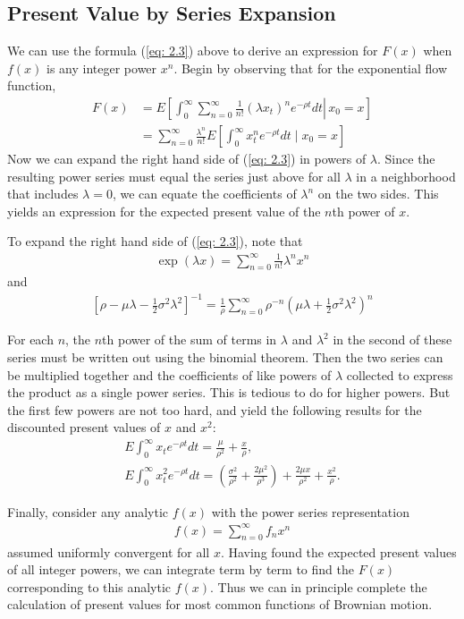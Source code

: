 \documentclass[\topdir/lecture\_notes.tex]{subfiles}
\begin{document}
\begin{optional}
\subsection{Present Value by Series Expansion}
We can use the formula (\ref{eq: 2.3}) above to derive an expression for $F(x)$ when $f(x)$ is any integer power $x^{n}$. Begin by observing that for the exponential flow function,
\begin{align*}
F(x) & =E\left[\left.\int_{0}^{\infty} \sum_{n=0}^{\infty} \frac{1}{n !}\left(\lambda x_{t}\right)^{n} e^{-\rho t} dt \right\rvert\, x_{0}=x\right] \\
& =\sum_{n=0}^{\infty} \frac{\lambda^{n}}{n !} E\left[\int_{0}^{\infty} x_{t}^{n} e^{-\rho t} dt \mid x_{0}=x\right]
\end{align*}
Now we can expand the right hand side of (\ref{eq: 2.3}) in powers of $\lambda$. Since the resulting power series must equal the series just above for all $\lambda$ in a neighborhood that includes $\lambda=0$, we can equate the coefficients of $\lambda^{n}$ on the two sides. This yields an expression for the expected present value of the $n$th power of $x$.

To expand the right hand side of (\ref{eq: 2.3}), note that
\begin{align*}
\exp (\lambda x)=\sum_{n=0}^{\infty} \frac{1}{n !} \lambda^{n} x^{n}
\end{align*}
and
\begin{align*}
\left[\rho-\mu \lambda-\frac{1}{2} \sigma^{2} \lambda^{2}\right]^{-1}=\frac{1}{\rho} \sum_{n=0}^{\infty} \rho^{-n}\left(\mu \lambda+\frac{1}{2} \sigma^{2} \lambda^{2}\right)^{n}
\end{align*}

For each $n$, the $n$th power of the sum of terms in $\lambda$ and $\lambda^{2}$ in the second of these series must be written out using the binomial theorem. Then the two series can be multiplied together and the coefficients of like powers of $\lambda$ collected to express the product as a single power series. This is tedious to do for higher powers. But the first few powers are not too hard, and yield the following results for the discounted present values of $x$ and $x^{2}$:
\begin{gather}
E \int_{0}^{\infty} x_{t} e^{-\rho t} dt=\frac{\mu}{\rho^{2}}+\frac{x}{\rho}, \label{eq: 2.5} \\
E \int_{0}^{\infty} x_{t}^{2} e^{-\rho t} dt=\left(\frac{\sigma^{2}}{\rho^{2}}+\frac{2 \mu^{2}}{\rho^{3}}\right)+\frac{2 \mu x}{\rho^{2}}+\frac{x^{2}}{\rho} . \label{eq: 2.6}
\end{gather}

Finally, consider any analytic $f(x)$ with the power series representation
\begin{align*}
f(x)=\sum_{n=0}^{\infty} f_{n} x^{n}
\end{align*}
assumed uniformly convergent for all $x$. Having found the expected present values of all integer powers, we can integrate term by term to find the $F(x)$ corresponding to this analytic $f(x)$. Thus we can in principle complete the calculation of present values for most common functions of Brownian motion.
\end{optional}
\end{document}
